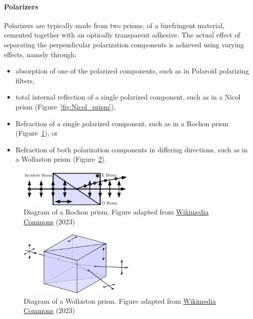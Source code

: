 \paragraph{Polarizers}
Polarizers are typically made from two prisms, of a birefringent material, cemented together with an optically transparent adhesive. The actual effect of separating the perpendicular polarization components is achieved using varying effects, namely through:
\begin{itemize}
    \item absorption of one of the polarized components, such as in Polaroid polarizing filters,
    \item total internal reflection of a single polarized component, such as in a Nicol prism (Figure~\ref{fig:Nicol_prism}),
    \item Refraction of a single polarized component, such as in a Rochon prism (Figure~\ref{fig:Rochon_prism}), or
    \item Refraction of both polarization components in differing directions, such as in a Wollaston prism (Figure~\ref{fig:Wollaston_prism}).
\end{itemize}

\begin{figure}[t]
    \centering
    \includegraphics[width=0.5\textwidth]{figures/2_rochon.pdf}
    \caption{Diagram of a Rochon prism. Figure adapted from \protect\href{https://commons.wikimedia.org/wiki/File:Rochon_Prism.svg}{Wikimedia Commons} (2023)}
    \label{fig:Rochon_prism}
\end{figure}

\begin{figure}[t]
    \centering
    \includegraphics[width=0.5\textwidth]{figures/2_wollaston.pdf}
    \caption{Diagram of a Wollaston prism. Figure adapted from \protect\href{https://commons.wikimedia.org/wiki/File:Wollaston-prism.svg}{Wikimedia Commons} (2023)}
    \label{fig:Wollaston_prism}
\end{figure}

